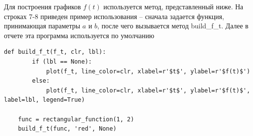 \documentclass[a4paper, 16pt]{article}
\begin{document}
    \noindent Для построения графиков $f(t)$ используется метод, представленный ниже.
    На строках 7-8 приведен пример использования -- сначала задается функция,
    принимающая параметры $a\text{ и }b$, после чего вызывается метод build\_{f}\_{t}.
    Далее в отчете эта программа используется по умолчанию
    \begin{lstlisting}[label=f_t_rect, caption=Программа для построения графика $f(t)$]
    def build_f_t(f_t, clr, lbl):
        if (lbl == None):
            plot(f_t, line_color=clr, xlabel=r'$t$', ylabel=r'$f(t)$')
        else:
            plot(f_t, line_color=clr, xlabel=r'$t$', ylabel=r'$f(t)$', label=lbl, legend=True)

    func = rectangular_function(1, 2)
    build_f_t(func, 'red', None)
    \end{lstlisting}
\end{document}
